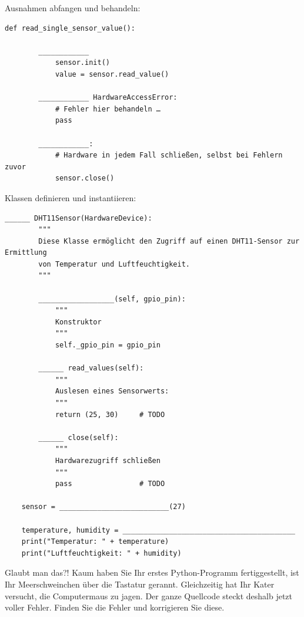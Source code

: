 \teilaufgabe
Ausnahmen abfangen und behandeln:

\begin{Verbatim}[gobble=4]
    def read_single_sensor_value():

        ____________
            sensor.init()
            value = sensor.read_value()

        ____________ HardwareAccessError:
            # Fehler hier behandeln …
            pass

        ____________:
            # Hardware in jedem Fall schließen, selbst bei Fehlern zuvor
            sensor.close()
\end{Verbatim}

\teilaufgabe
Klassen definieren und instantiieren:

\begin{Verbatim}[gobble=4]
    ______ DHT11Sensor(HardwareDevice):
        """
        Diese Klasse ermöglicht den Zugriff auf einen DHT11-Sensor zur Ermittlung
        von Temperatur und Luftfeuchtigkeit.
        """

        __________________(self, gpio_pin):
            """
            Konstruktor
            """
            self._gpio_pin = gpio_pin

        ______ read_values(self):
            """
            Auslesen eines Sensorwerts:
            """
            return (25, 30)     # TODO

        ______ close(self):
            """
            Hardwarezugriff schließen
            """
            pass                # TODO

    sensor = __________________________(27)

    temperature, humidity = _________________________________________
    print("Temperatur: " + temperature)
    print("Luftfeuchtigkeit: " + humidity)
\end{Verbatim}

\teilaufgabe
Glaubt man das?! Kaum haben Sie Ihr erstes Python-Programm fertiggestellt, ist
Ihr Meerschweinchen über die Tastatur gerannt. Gleichzeitig hat Ihr Kater versucht,
die Computermaus zu jagen. Der ganze Quellcode steckt deshalb jetzt voller Fehler.
Finden Sie die Fehler und korrigieren Sie diese.

